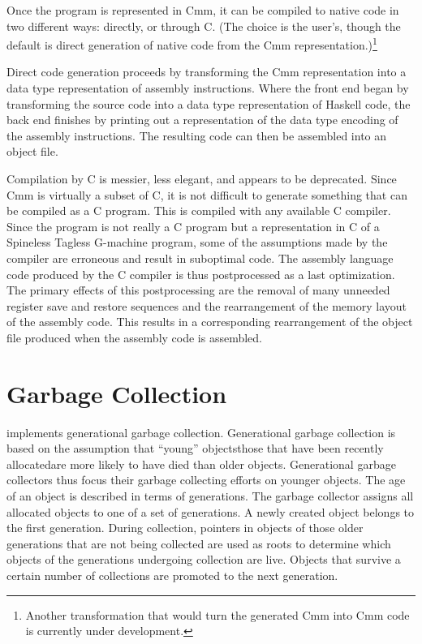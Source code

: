 Once the program is represented in Cmm, it can be compiled to native code in two different ways: directly, or through C. (The choice is the user's, though the default is direct generation of native code from the Cmm representation.)\footnote{Another transformation that would turn the generated Cmm into \CPS[long] Cmm code is currently under development.}

Direct code generation proceeds by transforming the Cmm representation into a data type representation of assembly instructions. Where the front end began by transforming the source code into a data type representation of Haskell code, the back end finishes by printing out a representation of the data type encoding of the assembly instructions. The resulting code can then be assembled into an object file.

Compilation by C is messier, less elegant, and appears to be deprecated. Since Cmm is virtually a subset of C, it is not difficult to generate something that can be compiled as a C program. This is compiled with any available C compiler. Since the program is not really a C program but a representation in C of a Spineless Tagless G-machine program, some of the assumptions made by the compiler are erroneous and result in suboptimal code. The assembly language code produced by the C compiler is thus postprocessed as a last optimization. The primary effects of this postprocessing are the removal of many unneeded register save and restore sequences and the rearrangement of the memory layout of the assembly code. This results in a corresponding rearrangement of the object file produced when the assembly code is assembled.

\section{Garbage Collection}
\GHC implements generational garbage collection. Generational garbage collection is based on the assumption that ``young'' objects\empause those that have been recently allocated\empause are more likely to have died than older objects. Generational garbage collectors thus focus their garbage collecting efforts on younger objects. The age of an object is described in terms of generations. The garbage collector assigns all allocated objects to one of a set of generations. A newly created object belongs to the first generation. During collection, pointers in objects of those older generations that are not being collected are used as roots to determine which objects of the generations undergoing collection are live. Objects that survive a certain number of collections are promoted to the next generation.

